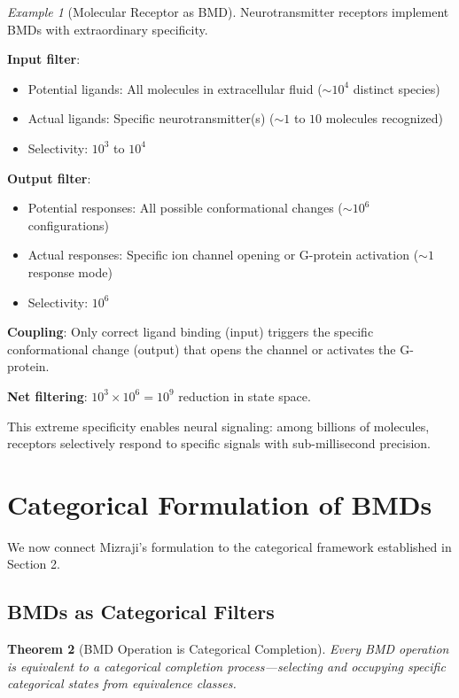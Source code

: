 \documentclass[11pt]{article}
\newtheorem{theorem}{Theorem}[section]
\theoremstyle{remark}
\newtheorem{example}[theorem]{Example}
\begin{document}
\begin{example}[Molecular Receptor as BMD]
\label{ex:receptor_bmd}
Neurotransmitter receptors implement BMDs with extraordinary specificity.

\textbf{Input filter}:
\begin{itemize}
\item Potential ligands: All molecules in extracellular fluid ($\sim 10^4$ distinct species)
\item Actual ligands: Specific neurotransmitter(s) ($\sim 1$ to $10$ molecules recognized)
\item Selectivity: $10^3$ to $10^4$
\end{itemize}

\textbf{Output filter}:
\begin{itemize}
\item Potential responses: All possible conformational changes ($\sim 10^{6}$ configurations)
\item Actual responses: Specific ion channel opening or G-protein activation ($\sim 1$ response mode)
\item Selectivity: $10^6$
\end{itemize}

\textbf{Coupling}: Only correct ligand binding (input) triggers the specific conformational change (output) that opens the channel or activates the G-protein.

\textbf{Net filtering}: $10^3 \times 10^6 = 10^9$ reduction in state space.

This extreme specificity enables neural signaling: among billions of molecules, receptors selectively respond to specific signals with sub-millisecond precision.
\end{example}

\section{Categorical Formulation of BMDs}

We now connect Mizraji's formulation to the categorical framework established in Section 2.

\subsection{BMDs as Categorical Filters}

\begin{theorem}[BMD Operation is Categorical Completion]
\label{thm:bmd_categorical}
Every BMD operation is equivalent to a categorical completion process—selecting and occupying specific categorical states from equivalence classes.
\end{theorem}
\end{document}
